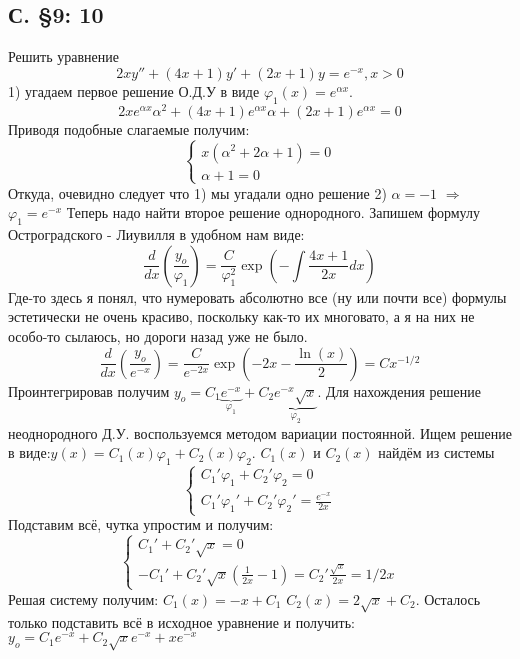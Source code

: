 \documentclass{article}
\begin{document}
\subsection{С. \S9: 10 }
Решить уравнение 
\begin{equation}
    2 x y'' + (4x+1)y' + (2x+1)y=e^{-x}, x>0
\end{equation}
1) угадаем первое решение О.Д.У в виде $\varphi_1(x)=e^{\alpha x}$.
\begin{equation}
    2x e^{\alpha x} \alpha^2 + (4x+1)e^{\alpha x}\alpha + (2x+1) e^{\alpha x}=0
\end{equation}
Приводя подобные слагаемые получим:
\begin{equation}
    \begin{cases}
    x(\alpha^2+2 \alpha +1)=0   \\
        \alpha +1 =0
    \end{cases}
\end{equation}
Откуда, очевидно следует что 1) мы угадали одно решение 2) $\alpha =-1$ $\Rightarrow$ $\varphi_1=e^{-x}$
Теперь надо найти второе решение однородного. Запишем формулу Остроградского - Лиувилля в удобном нам виде:
\begin{equation}
    \frac{d}{dx} \left( \frac{y_o}{\varphi_1} \right)= \frac{C}{\varphi_1^2} \exp \left( - \int \frac{4x+1} {2x}dx  \right) 
\end{equation}
\textcolor[rgb]{1,1,1}{Где-то здесь я понял, что нумеровать абсолютно все (ну или почти все) формулы эстетически не очень красиво, поскольку как-то их многовато, а я на них не особо-то сылаюсь, но дороги назад уже не было. }
\begin{equation}
    \frac{d}{dx} \left( \frac{y_o}{e^{-x}} \right)= \frac{C}{e^{-2x}} \exp \left(-2x - \frac{\ln(x)}{2}  \right) = C x^{-1/2}
\end{equation}
Проинтегрировав получим $y_o=C_1 \underbrace{e^{-x}}_{\varphi_1}+ C_2 \underbrace{e^{-x} \sqrt x}_{\varphi_2}$. 
Для нахождения решение неоднородного Д.У. воспользуемся методом вариации постоянной. 
Ищем решение в виде:$y(x)=C_1(x)\varphi_1 + C_2(x) \varphi_2$. $C_1(x)$ и $C_2(x)$ найдём из системы
\begin{equation}
    \begin{cases}
        C_1' \varphi_1+C_2'\varphi_2=0\\
        C_1' \varphi_1'+C_2'\varphi_2'=\frac{e^{-x}}{2x}
    \end{cases}
\end{equation}
Подставим всё, чутка упростим и получим:
\begin{equation}
    \begin{cases}
        C_1'+C_2' \sqrt x = 0\\
        -C_1'+C_2' \sqrt x (\frac{1}{2x}-1)=C_2' \frac{\sqrt x }{2x}=1/2x
    \end{cases}
\end{equation}
Решая систему получим: $C_1(x)= -x + C_1$ $C_2(x)=2 \sqrt x + C_2$. Осталось только подставить всё в исходное уравнение и получить: $y_o=C_1 e^{-x}+C_2\sqrt x e^{-x} + x e^{-x}$ 
\end{document}
